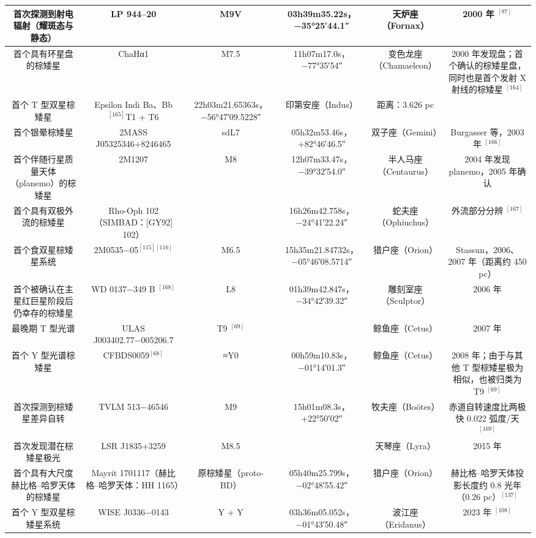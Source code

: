 \begin{table}[ht]
\begin{tabular}{|c|c|c|c|c|c|}
首次探测到射电辐射（耀斑态与静态）& LP 944–20 & M9V & 03h39m35.22s，−35°25′44.1″ & 天炉座（Fornax）& 2000 年 $^{[87]}$\\
\hline
首个具有环星盘的棕矮星 & ChaHα1 & M7.5 & 11h07m17.0s，−77°35′54″ & 变色龙座（Chamaeleon） & 2000 年发现盘；首个确认的棕矮星盘，同时也是首个发射 X 射线的棕矮星 $^{[164]}$\\
\hline
首个 T 型双星棕矮星 & Epsilon Indi Ba、Bb$^{[165]}$T1 + T6 & 22h03m21.65363s，−56°47′09.5228″ & 印第安座（Indus） & 距离：3.626 pc\\
\hline
首个银晕棕矮星 & 2MASS J05325346+8246465 & sdL7 & 05h32m53.46s，+82°46′46.5″ & 双子座（Gemini） & Burgasser 等，2003 年 $^{[166]}$\\
\hline
首个伴随行星质量天体（planemo）的棕矮星 & 2M1207 & M8 & 12h07m33.47s，−39°32′54.0″ & 半人马座（Centaurus）& 2004 年发现 planemo，2005 年确认\\
\hline
首个具有双极外流的棕矮星 & Rho-Oph 102（SIMBAD：[GY92] 102） &  & 16h26m42.758s，−24°41′22.24″ & 蛇夫座（Ophiuchus）& 外流部分分辨 $^{[167]}$\\
\hline
首个食双星棕矮星系统 & 2M0535−05$^{[115][116]}$ & M6.5 & 15h35m21.84732s，−05°46′08.5714″ & 猎户座（Orion）& Stassun，2006、2007 年（距离约 450 pc）\\
\hline
首个被确认在主星红巨星阶段后仍幸存的棕矮星 & WD 0137−349 B $^{[168]}$ & L8 & 01h39m42.847s，−34°42′39.32″ & 雕刻室座（Sculptor） & 2006 年\\
\hline
最晚期 T 型光谱 & ULAS J003402.77−005206.7 & T9 $^{[69]}$ &  & 鲸鱼座（Cetus） & 2007 年\\
\hline
首个 Y 型光谱棕矮星 & CFBDS0059$^{[68]}$ & ≈Y0 & 00h59m10.83s，−01°14′01.3″ & 鲸鱼座（Cetus） & 2008 年；由于与其他 T 型棕矮星极为相似，也被归类为 T9 $^{[69]}$\\
\hline
首次探测到棕矮星差异自转 & TVLM 513−46546 & M9 & 15h01m08.3s，+22°50′02″ & 牧夫座（Boötes）& 赤道自转速度比两极快 0.022 弧度/天 $^{[169]}$\\
\hline
首次发现潜在棕矮星极光 & LSR J1835+3259 & M8.5 &  & 天琴座（Lyra） & 2015 年\\
\hline
首个具有大尺度赫比格–哈罗天体的棕矮星 & Mayrit 1701117（赫比格–哈罗天体：HH 1165）& 原棕矮星（proto-BD） & 05h40m25.799s，−02°48′55.42″ & 猎户座（Orion） & 赫比格–哈罗天体投影长度约 0.8 光年（0.26 pc）$^{[137]}$\\
\hline
首个 Y 型双星棕矮星系统 & WISE J0336−0143 & Y + Y & 03h36m05.052s，−01°43′50.48″ & 波江座（Eridanus）& 2023 年 $^{[108]}$\\
\hline
\end{tabular}
\end{table}
